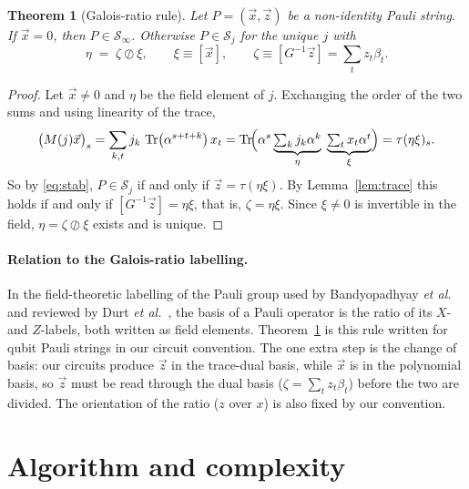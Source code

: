 \documentclass[11pt]{article}
\newtheorem{theorem}{Theorem}
\theoremstyle{definition}
\theoremstyle{remark}
\newcommand{\Tr}{\operatorname{Tr}}
\newcommand{\vx}{\vec{x}}
\newcommand{\vz}{\vec{z}}
\begin{document}
\begin{theorem}[Galois-ratio rule]\label{thm:ratio}
Let $P=(\vx,\vz)$ be a non-identity Pauli string.
If $\vx=0$, then $P\in\mathcal{S}_\infty$.
Otherwise $P\in\mathcal{S}_j$ for the unique $j$ with
\begin{equation}\label{eq:ratio}
  \eta \;=\; \zeta\oslash\xi,\qquad \xi\equiv[\vx],\qquad \zeta\equiv[G^{-1}\vz]=\sum_t z_t\beta_t .
\end{equation}
\end{theorem}

\begin{proof}
Let $\vx\neq 0$ and $\eta$ be the field element of $j$.
Exchanging the order of the two sums and using linearity of the trace,
\[
  \bigl(M(j)\vx\bigr)_s=\sum_{k,t} j_k\,\Tr\!\left(\alpha^{s+t+k}\right)x_t
  =\Tr\!\Bigl(\alpha^s\underbrace{\textstyle\sum_k j_k\alpha^k}_{\eta}\;\underbrace{\textstyle\sum_t x_t\alpha^t}_{\xi}\Bigr)
  =\tau(\eta\xi)_s .
\]
So by \eqref{eq:stab}, $P\in\mathcal{S}_j$ if and only if $\vz=\tau(\eta\xi)$.
By Lemma~\ref{lem:trace} this holds if and only if $[G^{-1}\vz]=\eta\xi$, that is, $\zeta=\eta\xi$.
Since $\xi\neq 0$ is invertible in the field, $\eta=\zeta\oslash\xi$ exists and is unique.
\end{proof}

\paragraph{Relation to the Galois-ratio labelling.}
In the field-theoretic labelling of the Pauli group used by Bandyopadhyay \emph{et al.}~\cite{Bandyopadhyay2002} and reviewed by Durt \emph{et al.}~\cite{Durt2010}, the basis of a Pauli operator is the ratio of its $X$- and $Z$-labels, both written as field elements.
Theorem~\ref{thm:ratio} is this rule written for qubit Pauli strings in our circuit convention.
The one extra step is the change of basis: our circuits produce $\vz$ in the trace-dual basis, while $\vx$ is in the polynomial basis, so $\vz$ must be read through the dual basis ($\zeta=\sum_t z_t\beta_t$) before the two are divided.
The orientation of the ratio ($z$ over $x$) is also fixed by our convention.

\section{Algorithm and complexity}
\end{document}
